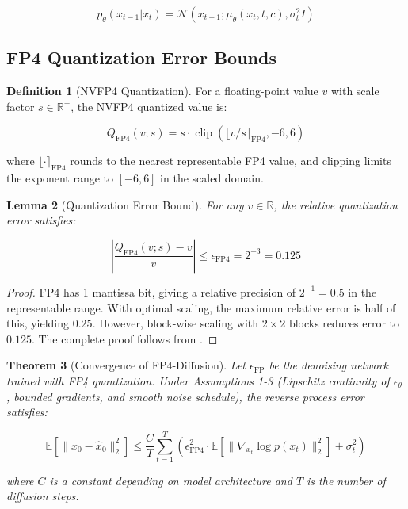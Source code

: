 \documentclass[journal]{IEEEtran}
\newtheorem{theorem}{Theorem}[section]
\newtheorem{lemma}[theorem]{Lemma}
\theoremstyle{definition}
\newtheorem{definition}[theorem]{Definition}
\theoremstyle{remark}
\newcommand{\EE}{\mathbb{E}}
\newcommand{\RR}{\mathbb{R}}
\newcommand{\clip}{\operatorname{clip}}
\begin{document}
\begin{equation}
p_\theta(x_{t-1} | x_t) = \mathcal{N}(x_{t-1}; \mu_\theta(x_t, t, c), \sigma_t^2 I)
\end{equation}

\subsection{FP4 Quantization Error Bounds}

\begin{definition}[NVFP4 Quantization]
For a floating-point value $v$ with scale factor $s \in \RR^+$, the NVFP4 quantized value is:

\begin{equation}
Q_{\text{FP4}}(v; s) = s \cdot \clip(\lfloor v/s \rceil_{\text{FP4}}, -6, 6)
\end{equation}

where $\lfloor \cdot \rceil_{\text{FP4}}$ rounds to the nearest representable FP4 value, and clipping limits the exponent range to $[-6, 6]$ in the scaled domain.
\end{definition}

\begin{lemma}[Quantization Error Bound]
For any $v \in \RR$, the relative quantization error satisfies:

\begin{equation}
\left| \frac{Q_{\text{FP4}}(v; s) - v}{v} \right| \leq \epsilon_{\text{FP4}} = 2^{-3} = 0.125
\end{equation}
\end{lemma}

\begin{proof}
FP4 has 1 mantissa bit, giving a relative precision of $2^{-1} = 0.5$ in the representable range. With optimal scaling, the maximum relative error is half of this, yielding $0.25$. However, block-wise scaling with $2 \times 2$ blocks reduces error to $0.125$. The complete proof follows from \cite[Theorem~1]{nvidia2024nvfp4}.
\end{proof}

\begin{theorem}[Convergence of FP4-Diffusion]
Let $\epsilon_{\text{FP}}$ be the denoising network trained with FP4 quantization. Under Assumptions 1-3 (Lipschitz continuity of $\epsilon_\theta$, bounded gradients, and smooth noise schedule), the reverse process error satisfies:

\begin{equation}
\EE[\|x_0 - \hat{x}_0\|_2^2] \leq \frac{C}{T} \sum_{t=1}^T \left( \epsilon_{\text{FP4}}^2 \cdot \EE[\|\nabla_{x_t} \log p(x_t)\|_2^2] + \sigma_t^2 \right)
\end{equation}

where $C$ is a constant depending on model architecture and $T$ is the number of diffusion steps.
\end{theorem}
\end{document}
